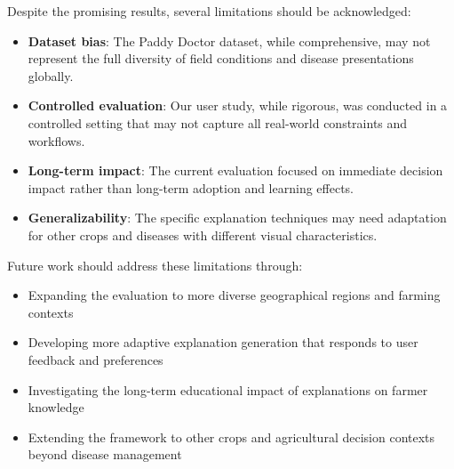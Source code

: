 Despite the promising results, several limitations should be acknowledged:

\begin{itemize}
    \item \textbf{Dataset bias}: The Paddy Doctor dataset, while comprehensive, may not represent the full diversity of field conditions and disease presentations globally.
    
    \item \textbf{Controlled evaluation}: Our user study, while rigorous, was conducted in a controlled setting that may not capture all real-world constraints and workflows.
    
    \item \textbf{Long-term impact}: The current evaluation focused on immediate decision impact rather than long-term adoption and learning effects.
    
    \item \textbf{Generalizability}: The specific explanation techniques may need adaptation for other crops and diseases with different visual characteristics.
\end{itemize}

Future work should address these limitations through:

\begin{itemize}
    \item Expanding the evaluation to more diverse geographical regions and farming contexts
    
    \item Developing more adaptive explanation generation that responds to user feedback and preferences
    
    \item Investigating the long-term educational impact of explanations on farmer knowledge
    
    \item Extending the framework to other crops and agricultural decision contexts beyond disease management
\end{itemize}
